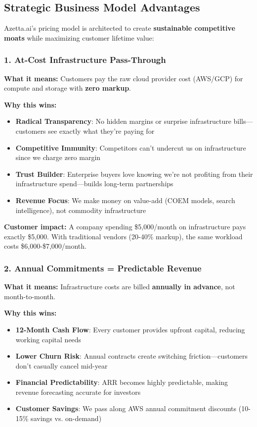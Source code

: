 \subsection{Strategic Business Model Advantages}

Azetta.ai's pricing model is architected to create \textbf{sustainable competitive moats} while maximizing customer lifetime value:

\subsubsection{1. At-Cost Infrastructure Pass-Through}

\textbf{What it means:} Customers pay the raw cloud provider cost (AWS/GCP) for compute and storage with \textbf{zero markup}.

\textbf{Why this wins:}
\begin{itemize}[noitemsep]
    \item \textbf{Radical Transparency}: No hidden margins or surprise infrastructure bills—customers see exactly what they're paying for
    \item \textbf{Competitive Immunity}: Competitors can't undercut us on infrastructure since we charge zero margin
    \item \textbf{Trust Builder}: Enterprise buyers love knowing we're not profiting from their infrastructure spend—builds long-term partnerships
    \item \textbf{Revenue Focus}: We make money on value-add (COEM models, search intelligence), not commodity infrastructure
\end{itemize}

\textbf{Customer impact:} A company spending \$5,000/month on infrastructure pays exactly \$5,000. With traditional vendors (20-40\% markup), the same workload costs \$6,000-\$7,000/month.

\subsubsection{2. Annual Commitments = Predictable Revenue}

\textbf{What it means:} Infrastructure costs are billed \textbf{annually in advance}, not month-to-month.

\textbf{Why this wins:}
\begin{itemize}[noitemsep]
    \item \textbf{12-Month Cash Flow}: Every customer provides upfront capital, reducing working capital needs
    \item \textbf{Lower Churn Risk}: Annual contracts create switching friction—customers don't casually cancel mid-year
    \item \textbf{Financial Predictability}: ARR becomes highly predictable, making revenue forecasting accurate for investors
    \item \textbf{Customer Savings}: We pass along AWS annual commitment discounts (10-15\% savings vs. on-demand)
\end{itemize}

